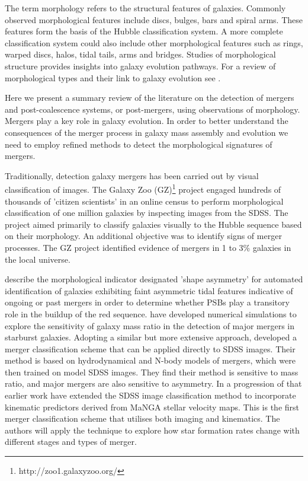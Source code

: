 The term morphology refers to the structural features of galaxies. Commonly observed morphological features include discs, bulges, bars and spiral arms. These features form the basis of the Hubble classification system. A more complete classification system could also include other morphological features such as rings, warped discs, halos, tidal tails, arms and bridges. Studies of  morphological structure provides insights into galaxy evolution pathways. For a review of morphological types and their link to galaxy evolution see \cite{2011arXiv1102.0550B}.

Here we present a summary review of the literature on the detection of mergers and post-coalescence systems, or post-mergers, using observations of morphology. Mergers play a key role in galaxy evolution. In order to better understand the consequences of the merger process in galaxy mass assembly and evolution we need to employ refined methods to detect the morphological signatures of mergers.

Traditionally, detection galaxy mergers has been carried out by visual classification of images. The Galaxy Zoo (GZ)\footnote{http://zoo1.galaxyzoo.org/} project \citet{10.1111/j.1365-2966.2008.13689.x,10.1111/j.1365-2966.2010.17432.x, 2017MNRAS.464.4176W} engaged hundreds of thousands of 'citizen scientists' in an online census to perform morphological classification of one million galaxies by inspecting images from the SDSS. The project aimed primarily to classify galaxies visually to the Hubble sequence based on their morphology. An additional objective was to identify signs of merger processes. The GZ project identified evidence of mergers in 1 to 3\% galaxies in the local universe.

\cite{2016MNRAS.456.3032P} describe the morphological indicator designated 'shape asymmetry' for automated identification of galaxies exhibiting faint asymmetric tidal features indicative of ongoing or past mergers in order to determine whether PSBs play a transitory role in the buildup of the red sequence. \cite{2011arXiv1102.0550B} have developed numerical simulations to explore the sensitivity of galaxy mass ratio in the detection of major mergers in starburst galaxies. Adopting a similar but more extensive approach, \cite{2019ApJ...872...76N} developed a merger classification scheme that can be applied directly to SDSS images. Their method is based on hydrodynamical and N-body models of mergers, which were then trained on model SDSS images. They find their method is sensitive to mass ratio, and major mergers are also sensitive to asymmetry. In a progression of that earlier work  \cite{2019DDA....5020304N} have extended the SDSS image classification method to incorporate kinematic predictors derived from MaNGA stellar velocity maps. This is the first merger classification scheme that utilises both imaging and kinematics. The authors will apply the technique to explore how star formation rates change with different stages and types of merger. 

